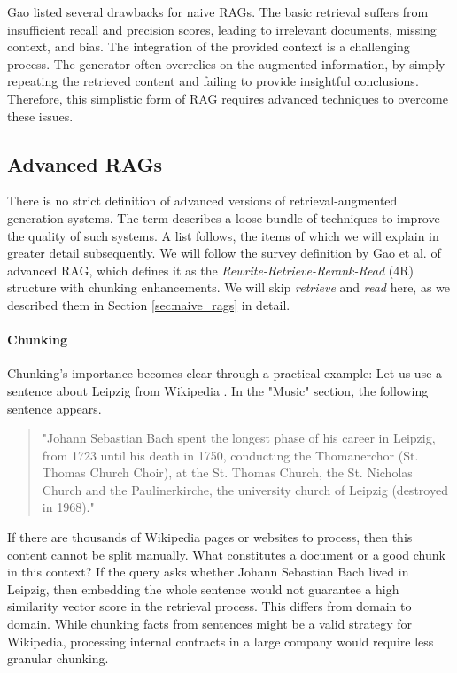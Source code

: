 Gao \cite{Gao.18.12.2023} listed several drawbacks for naive RAGs. The basic retrieval suffers from insufficient recall and precision scores, leading to irrelevant documents, missing context, and bias. The integration of the provided context is a challenging process. The generator often overrelies on the augmented information, by simply repeating the retrieved content and failing to provide insightful conclusions. Therefore, this simplistic form of RAG requires advanced techniques to overcome these issues.

\subsection{Advanced RAGs}
\label{sec:advanced_rags}

There is no strict definition of advanced versions of retrieval-augmented generation systems. The term describes a loose bundle of techniques to improve the quality of such systems. A list follows, the items of which we will explain in greater detail subsequently. We will follow the survey definition by Gao et al. of advanced RAG, which defines it as the \textit{Rewrite-Retrieve-Rerank-Read} (4R) structure with chunking enhancements. We will skip \textit{retrieve} and \textit{read} here, as we described them in Section \ref{sec:naive_rags} in detail.

\paragraph{Chunking}
\label{sec:chunk}
Chunking's importance becomes clear through a practical example: Let us use a sentence about Leipzig from Wikipedia \cite{LeipzigWikipedia.2025}. In the "Music" section, the following sentence appears.

\begin{quote}
    "Johann Sebastian Bach spent the longest phase of his career in Leipzig, from 1723 until his death in 1750, conducting the Thomanerchor (St. Thomas Church Choir), at the St. Thomas Church, the St. Nicholas Church and the Paulinerkirche, the university church of Leipzig (destroyed in 1968)."
\end{quote}

If there are thousands of Wikipedia pages or websites to process, then this content cannot be split manually. What constitutes a document or a good chunk in this context? If the query asks whether Johann Sebastian Bach lived in Leipzig, then embedding the whole sentence would not guarantee a high similarity vector score in the retrieval process. This differs from domain to domain. While chunking facts from sentences might be a valid strategy for Wikipedia, processing internal contracts in a large company would require less granular chunking.

